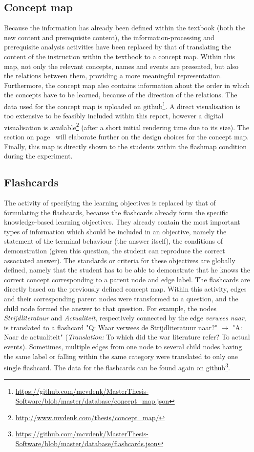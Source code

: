 \subsection{Concept map}

Because the information has already been defined within the textbook (both the new content and prerequisite content), the information-processing and prerequisite analysis activities have been replaced by that of translating the content of the instruction within the textbook to a concept map. Within this map, not only the relevant concepts, names and events are presented, but also the relations between them, providing a more meaningful representation. Furthermore, the concept map also contains information about the order in which the concepts have to be learned, because of the direction of the relations. The data used for the concept map is uploaded on github\footnote{\url{https://github.com/mcvdenk/MasterThesis-Software/blob/master/database/concept_map.json}}. A direct visualisation is too extensive to be feasibly included within this report, however a digital visualisation is available\footnote{\url{http://www.mvdenk.com/thesis/concept_map/}} (after a short initial rendering time due to its size). The  section on page~\pageref{sec:cmapframework} will elaborate further on the design choices for the concept map. Finally, this map is directly shown to the students within the flashmap condition during the experiment.

\subsection{Flashcards}

The activity of specifying the learning objectives is replaced by that of formulating the flashcards, because the flashcards already form the specific knowledge-based learning objectives. They already contain the most important types of information which should be included in an objective, namely the statement of the terminal behaviour (the answer itself), the conditions of demonstration (given this question, the student can reproduce the correct associated answer). The standards or criteria for these objectives are globally defined, namely that the student has to be able to demonstrate that he knows the correct concept corresponding to a parent node and edge label. The flashcards are directly based on the previously defined concept map. Within this activity, edges and their corresponding parent nodes were transformed to a question, and the child node formed the answer to that question. For example, the nodes \emph{Strijdliteratuur} and \emph{Actualiteit}, respectively connected by the edge \emph{verwees naar}, is translated to a flashcard "Q: Waar verwees de Strijdliteratuur naar?" $\rightarrow$ "A: Naar de actualiteit" (\emph{Translation:} To which did the war literature refer? To actual events). Sometimes, multiple edges from one node to several child nodes having the same label or falling within the same category were translated to only one single flashcard. The data for the flashcards can be found again on github\footnote{\url{https://github.com/mcvdenk/MasterThesis-Software/blob/master/database/flashcards.json}}.


